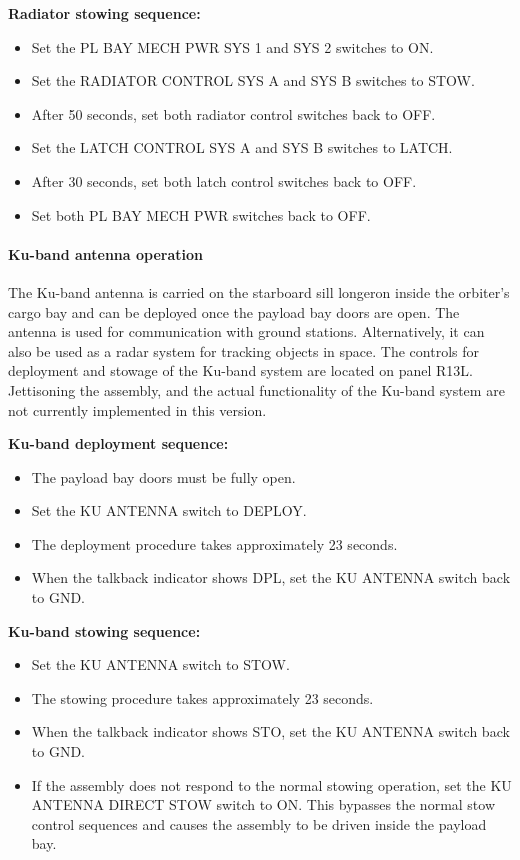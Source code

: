 \documentclass[Orbiter User Manual.tex]{subfiles}
\begin{document}
\textbf{Radiator stowing sequence:}
\begin{itemize}
	\item Set the PL BAY MECH PWR SYS 1 and SYS 2 switches to ON.
	\item Set the RADIATOR CONTROL SYS A and SYS B switches to STOW.
	\item After 50 seconds, set both radiator control switches back to OFF.
	\item Set the LATCH CONTROL SYS A and SYS B switches to LATCH.
	\item After 30 seconds, set both latch control switches back to OFF.
	\item Set both PL BAY MECH PWR switches back to OFF.
\end{itemize}


\paragraph{Ku-band antenna operation}
\label{para:atlantis_antenna}
The Ku-band antenna is carried on the starboard sill longeron inside the
orbiter's cargo bay and can be deployed once the payload bay doors are open. The
antenna is used for communication with ground stations. Alternatively, it can
also be used as a radar system for tracking objects in space. The controls for
deployment and stowage of the Ku-band system are located on panel R13L.
Jettisoning the assembly, and the actual functionality of the Ku-band system are
not currently implemented in this version.

\textbf{Ku-band deployment sequence:}
\begin{itemize}
	\item The payload bay doors must be fully open.
	\item Set the KU ANTENNA switch to DEPLOY.
	\item The deployment procedure takes approximately 23 seconds.
	\item When the talkback indicator shows DPL, set the KU ANTENNA switch back
		to GND.
\end{itemize}

\textbf{Ku-band stowing sequence:}
	\begin{itemize}
	\item Set the KU ANTENNA switch to STOW.
	\item The stowing procedure takes approximately 23 seconds.
	\item When the talkback indicator shows STO, set the KU ANTENNA switch back
		to GND.
	\item If the assembly does not respond to the normal stowing operation, set
		the KU ANTENNA DIRECT STOW switch to ON. This bypasses the normal stow
		control sequences and causes the assembly to be driven inside the
		payload bay.
\end{itemize}
\end{document}
